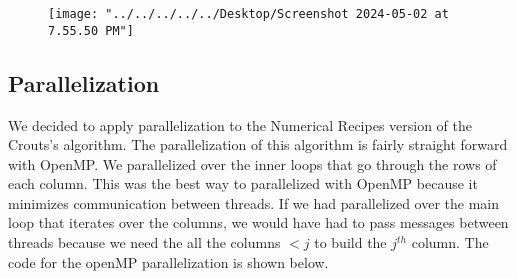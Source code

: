 \documentclass[12pt,letterpaper]{article}
\begin{document}
   \begin{figure}[H]
   	\centering
   	\texttt{[image: "../../../../../Desktop/Screenshot 2024-05-02 at 7.55.50 PM"]}
   	\label{fig:crout}
   \end{figure}


	\subsection{Parallelization}
	We decided to apply parallelization to the Numerical Recipes version of the Crouts's algorithm. The parallelization of this algorithm is fairly straight forward with OpenMP. We parallelized over the inner loops that go through the rows of each column. This was the best way to parallelized with OpenMP because it minimizes communication between threads. If we had parallelized over the main loop that iterates over the columns, we would have had to pass messages between threads because we need the all the columns \(< j\) to build the \(j^{th}\) column. The code for the openMP parallelization is shown below.
\end{document}

